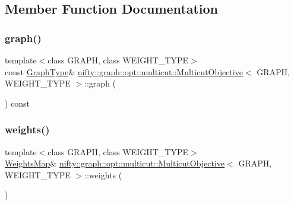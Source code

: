 \subsection{Member Function Documentation}
\mbox{\label{classnifty_1_1graph_1_1opt_1_1multicut_1_1MulticutObjective_a77da7e88d6b4818554de5b30a6b21bf1}} 
\subsubsection{\texorpdfstring{graph()}{graph()}}
{\footnotesize\ttfamily template$<$class G\+R\+A\+PH, class W\+E\+I\+G\+H\+T\+\_\+\+T\+Y\+PE$>$ \\
const \hyperlink{classnifty_1_1graph_1_1opt_1_1multicut_1_1MulticutObjective_a542786fae244388460be05f98396f864}{Graph\+Type}\& \hyperlink{classnifty_1_1graph_1_1opt_1_1multicut_1_1MulticutObjective}{nifty\+::graph\+::opt\+::multicut\+::\+Multicut\+Objective}$<$ G\+R\+A\+PH, W\+E\+I\+G\+H\+T\+\_\+\+T\+Y\+PE $>$\+::graph (\begin{DoxyParamCaption}{ }\end{DoxyParamCaption}) const\hspace{0.3cm}{\ttfamily [inline]}}

\mbox{\label{classnifty_1_1graph_1_1opt_1_1multicut_1_1MulticutObjective_a8789c71e5f2591ab17dc56a90e6a0f6e}} 
\subsubsection{\texorpdfstring{weights()}{weights()}\hspace{0.1cm}{\footnotesize\ttfamily [1/2]}}
{\footnotesize\ttfamily template$<$class G\+R\+A\+PH, class W\+E\+I\+G\+H\+T\+\_\+\+T\+Y\+PE$>$ \\
\hyperlink{classnifty_1_1graph_1_1opt_1_1multicut_1_1MulticutObjective_aa893b1c13cb7add0c87445a1ed24d214}{Weights\+Map}\& \hyperlink{classnifty_1_1graph_1_1opt_1_1multicut_1_1MulticutObjective}{nifty\+::graph\+::opt\+::multicut\+::\+Multicut\+Objective}$<$ G\+R\+A\+PH, W\+E\+I\+G\+H\+T\+\_\+\+T\+Y\+PE $>$\+::weights (\begin{DoxyParamCaption}{ }\end{DoxyParamCaption})\hspace{0.3cm}{\ttfamily [inline]}}

